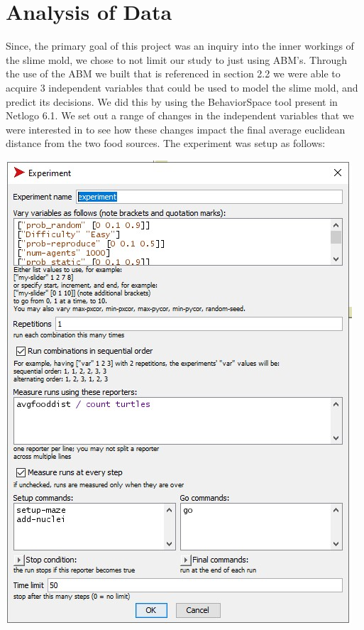 \documentclass[a4paper, 11pt]{article}
\begin{document}
\section{Analysis of Data}
Since, the primary goal of this project was an inquiry into the inner workings of the slime mold, we chose to not limit our study to just using ABM's. Through the use of the ABM we built that is referenced in section 2.2 we were able to acquire 3 independent variables that could be used to model the slime mold, and predict its decisions. We did this by using the BehaviorSpace tool present in Netlogo 6.1. We set out a range of changes in the independent variables that we were interested in to see how these changes impact the final average euclidean distance from the two food sources. The experiment was setup as follows: 
\begin{center}
    \includegraphics[scale=0.9]{Images/behaviorspace.jpg}
\end{center}
\newpage
\end{document}
